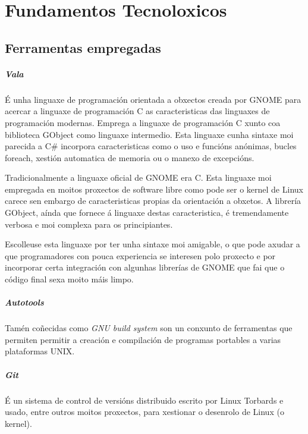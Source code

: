 \chapter[Fundamentos Tecnoloxicos]{Fundamentos Tecnoloxicos}

\section{Ferramentas empregadas}

\paragraph{Vala} É unha linguaxe de programación orientada a obxectos creada por GNOME para acercar a linguaxe de programación C as caracteristicas das linguaxes de programación modernas. Emprega a linguaxe de programación C xunto coa biblioteca GObject como linguaxe intermedio. Esta linguaxe cunha sintaxe moi parecida a C\# incorpora caracteristicas como o uso e funcións anónimas, bucles foreach, xestión automatica de memoria ou o manexo de excepcións.

Tradicionalmente a linguaxe oficial de GNOME era C. Esta linguaxe moi empregada en moitos proxectos de software libre como pode ser o kernel de Linux carece sen embargo de caracteristicas propias da orientación a obxetos. A librería GObject, aínda que fornece á linguaxe destas caracteristica, é tremendamente verbosa e moi complexa para os principiantes.

Escolleuse esta linguaxe por ter unha sintaxe moi amigable, o que pode axudar a que programadores con pouca experiencia se interesen polo proxecto e por incorporar certa integración con algunhas librerías de GNOME que fai que o código final sexa moito máis limpo.

 \paragraph{Autotools} Tamén coñecidas como \emph{GNU build system} son un conxunto de ferramentas que permiten permitir a creación e compilación de programas portables a varias plataformas UNIX.

 \paragraph{Git} É un sistema de control de versións distribuido escrito por Linux Torbards e usado, entre outros moitos proxectos, para xestionar o desenrolo de Linux (o kernel).


